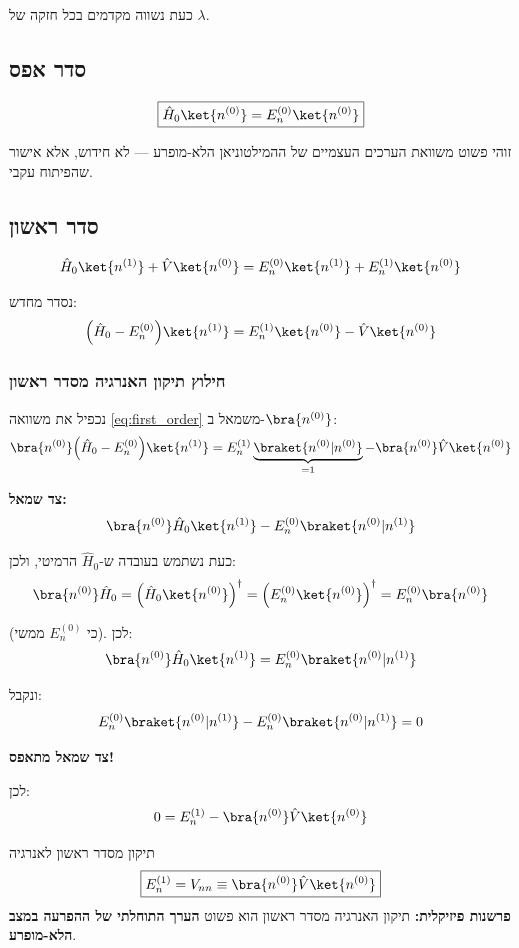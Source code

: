 כעת נשווה מקדמים בכל חזקה של $\lambda$.

\subsection{סדר אפס}
\[
\boxed{\hat{H}_0\ket{n^{(0)}} = E_n^{(0)}\ket{n^{(0)}}}
\]

זוהי פשוט משוואת הערכים העצמיים של ההמילטוניאן הלא-מופרע — לא חידוש, אלא אישור שהפיתוח עקבי.

\subsection{סדר ראשון}
\[
\hat{H}_0\ket{n^{(1)}} + \hat{V}\ket{n^{(0)}} = E_n^{(0)}\ket{n^{(1)}} + E_n^{(1)}\ket{n^{(0)}}
\]

נסדר מחדש:
\begin{equation}\label{eq:first_order}
\Big(\hat{H}_0 - E_n^{(0)}\Big)\ket{n^{(1)}} = E_n^{(1)}\ket{n^{(0)}} - \hat{V}\ket{n^{(0)}}
\end{equation}

\subsubsection{חילוץ תיקון האנרגיה מסדר ראשון}

נכפיל את משוואה \eqref{eq:first_order} משמאל ב-$\bra{n^{(0)}}$:
\[
\bra{n^{(0)}}\Big(\hat{H}_0 - E_n^{(0)}\Big)\ket{n^{(1)}} = E_n^{(1)}\underbrace{\braket{n^{(0)}|n^{(0)}}}_{=1} - \bra{n^{(0)}}\hat{V}\ket{n^{(0)}}
\]

\textbf{צד שמאל:}
\[
\bra{n^{(0)}}\hat{H}_0\ket{n^{(1)}} - E_n^{(0)}\braket{n^{(0)}|n^{(1)}}
\]

כעת נשתמש בעובדה ש-$\hat{H}_0$ הרמיטי, ולכן:
\[
\bra{n^{(0)}}\hat{H}_0 = \Big(\hat{H}_0\ket{n^{(0)}}\Big)^\dagger = \Big(E_n^{(0)}\ket{n^{(0)}}\Big)^\dagger = E_n^{(0)}\bra{n^{(0)}}
\]

(כי $E_n^{(0)}$ ממשי). לכן:
\[
\bra{n^{(0)}}\hat{H}_0\ket{n^{(1)}} = E_n^{(0)}\braket{n^{(0)}|n^{(1)}}
\]

ונקבל:
\[
E_n^{(0)}\braket{n^{(0)}|n^{(1)}} - E_n^{(0)}\braket{n^{(0)}|n^{(1)}} = 0
\]

\textbf{צד שמאל מתאפס!}

לכן:
\[
0 = E_n^{(1)} - \bra{n^{(0)}}\hat{V}\ket{n^{(0)}}
\]

\begin{resultbox}{תיקון מסדר ראשון לאנרגיה}
\[
\boxed{E_n^{(1)} = V_{nn} \equiv \bra{n^{(0)}}\hat{V}\ket{n^{(0)}}}
\]
\textbf{פרשנות פיזיקלית:} תיקון האנרגיה מסדר ראשון הוא פשוט \textbf{הערך התוחלתי של ההפרעה במצב הלא-מופרע}.
\end{resultbox}

